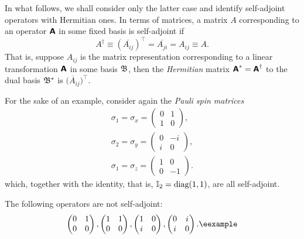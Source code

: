 In what follows, we shall consider only the latter case and identify self-adjoint operators with Hermitian ones.
In terms of matrices, a matrix $A$ corresponding to an operator $\textsf{\textbf{A}}$ in
some fixed basis is self-adjoint
if
\begin{equation}
A^{\dagger}\equiv (\overline{A_{ij}})^\intercal =  \overline{A_{ji}} =A_{ij} \equiv A.
\end{equation}
That is, suppose $A_{ij}$ is the matrix representation
corresponding to a linear transformation $\textsf{\textbf{A}}$  in some basis ${\frak B}$,
then the {\em Hermitian} matrix $\textsf{\textbf{A}}^\ast = \textsf{\textbf{A}}^\dagger$
to the dual basis
${\frak B}^\ast $
is
$\overline{(A_{ij}})^\intercal $.



{\color{blue}
\bexample
For the sake of an example, consider again the
{\em Pauli spin matrices}
\begin{equation}
\begin{split}
\sigma_1=\sigma_x=
\begin{pmatrix}
0&1\\
1&0
\end{pmatrix}
,   \\
\sigma_2=\sigma_y=
\begin{pmatrix}
0&-i\\
i&0
\end{pmatrix}
,   \\
\sigma_1=\sigma_z=
\begin{pmatrix}
1&0\\
0&-1
\end{pmatrix}
.
\end{split}
\end{equation}
which, together with the identity, that is, ${\Bbb I}_2=\textrm{diag}(1,1)$,  are all self-adjoint.

The following operators are not self-adjoint:
\begin{equation}
\begin{pmatrix}
0&1\\
0&0
\end{pmatrix}
 ,
\begin{pmatrix}
1&1\\
0&0
\end{pmatrix}
,
\begin{pmatrix}
1&0\\
i&0
\end{pmatrix}
,
\begin{pmatrix}
0&i\\
i&0
\end{pmatrix}
.{\textrm{\eexample}}
\end{equation}
%
}

